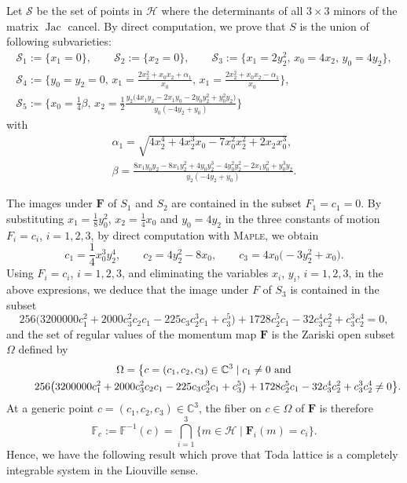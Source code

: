 \documentclass[10pt,a4paper]{amsart}
\numberwithin{equation}{section}
\begin{document}
Let $\mathcal{S}$ be the set of points in $\mathcal{H}$ where the
determinants of all $3 \times 3$ minors of the matrix $\operatorname{Jac}$ cancel.
By direct computation, we prove that $S$ is the union of following
subvarieties:
\begin{gather*}
\mathcal{S}_1:= \{x_1=0\},\qquad \mathcal{S}_2:= \{x_2=0\},\qquad \mathcal{S}_3:=\big\{x_1=2y_2^2,\,x_0=4x_2,\,y_0=4y_2\big\},\\
\mathcal{S}_4:= \biggl\{y_0=y_2=0,\,x_1=\frac{2x_2^2+x_0x_2+ \alpha_1}{x_0},\,x_1=\frac{2x_2^2+x_0x_2-\alpha_1}{x_0}\biggr\},\\
\mathcal{S}_5:= \biggl\{x_0=\frac{1}{4}\beta,\, x_2=\frac{1}{2}\frac{y_2\bigl(4x_1y_2-2x_1y_0-2y_0y_2^2+y_0^2y_2\bigr)}{y_0(-4y_2+y_0)}\biggr\}
\end{gather*}
 with
\begin{gather*}
\alpha_1=\sqrt{4x_2^4+4x_2^3x_0-7x_0^2x_2^2+2x_2x_0^3},\\
\beta=\frac{8x_1y_0y_2-8x_1y_2^2+4y_0y_2^3-4y_0^2y_2^2-2x_1y_0^2+y_0^3y_2}{y_2(-4y_2+ y_0 )}.
\end{gather*}

 The images under $\mathbf{F}$ of $S_1$ and $S_2$ are contained in the subset $ F_1=c_1=0.$
 By substituting $x_1=\frac{1}{8}y_0^2$, $x_2=\frac{1}{4}x_0$ and $y_0=4y_2$ in the three constants
of motion $F_i=c_i$, $i=1,2,3$, by direct computation
with \textsc{Maple}, we obtain
\[
 c_1=\dfrac{1}{4}x_0^3y_2^4, \qquad
 c_2=4y_2^2-8x_0, \qquad
 c_3=4x_0\bigl(-3y_2^2+x_0\bigr).
\]
Using $F_i=c_i$, $i=1,2,3$, and eliminating the variables
$x_i$, $y_i$, $i=1,2,3$, in the above expresions, we deduce that
the image under $F$ of $S_3$ is contained in the subset
\[256\bigl(3200000c_1^2+2000c_3^2c_2c_1-225c_3c_2^3c_1
+c_3^5\bigr)+1728c_2^5c_1 -32c_3^4c_2^2+c_3^3c_2^4=0,\] and the set
of regular values of the momentum map $\mathbf{F}$ is the Zariski
open subset $\Omega$ defined by
\begin{gather*}
 \Omega = \big\{c=(c_1,c_2,c_3) \in \mathbb{C}^3 \mid c_1\neq 0 \ \text{and} \\ \hphantom{\Omega = \big\{}{}
 256\bigl(3200000c_1^2+2000c_3 ^2c_2c_1-225c_3c_2^3c_1+c_3^5\bigr)+1728c_2^5c_1-32c_3^4c_2^2+c_3^3c_2^4\neq 0\big\}.
\end{gather*}
At a generic point $c=(c_1,c_2,c_3) \in \mathbb{C}^3$,
the fiber on $c\in \Omega$ of $\mathbf{F }$ is therefore
\[\mathbb{F}_c:= \mathbb{F}^{-1}(c)=\bigcap_{i=1}^3
\{m\in \mathcal{H}\mid \mathbf{F}_i(m)=c_i\}.\]
Hence, we have the following result which prove that
 Toda lattice is a completely integrable
system in the Liouville sense.
\end{document}
